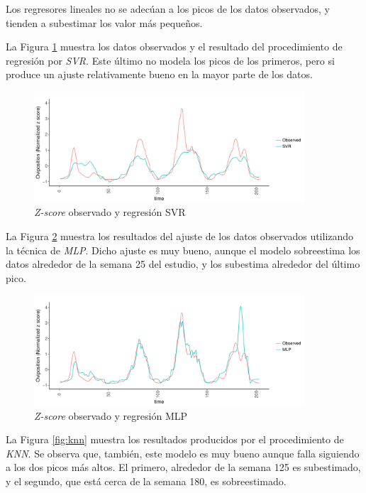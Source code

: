     \par Los regresores lineales no se adecúan a los picos de los datos
    observados, y tienden a subestimar los valor más pequeños.

    \par La Figura \ref{fig:svr} muestra los datos observados y el resultado
      del procedimiento de regresión por \textit{SVR}. Este último no modela los
      picos de los primeros, pero si produce un ajuste relativamente bueno
      en la mayor parte de los datos.
      \begin{figure}[hbt]
      \centering%
      \includegraphics[width=0.9\textwidth]{images/svr}%
      \caption{\textit{Z-score} observado y regresión SVR}\label{fig:svr}
      \end{figure}


    \par La Figura \ref{fig:mlp} muestra los resultados del ajuste de
    los datos observados utilizando la técnica de \textit{MLP}. Dicho ajuste es muy
    bueno, aunque el modelo sobreestima los datos alrededor de la semana 25
    del estudio, y los subestima alrededor del último pico.
      \begin{figure}[hbt]
      \centering%
      \includegraphics[width=0.9\textwidth]{images/mlp}%
      \caption{\textit{Z-score} observado y regresión MLP}\label{fig:mlp}
      \end{figure}


  \par La Figura \ref{fig:knn} muestra los resultados producidos por el procedimiento
    de \textit{KNN}. Se observa que, también, este modelo es muy bueno aunque
    falla siguiendo a los dos picos más altos. El primero, alrededor de la semana
    125 es subestimado, y el segundo, que está cerca de la semana 180, es
    sobreestimado.

